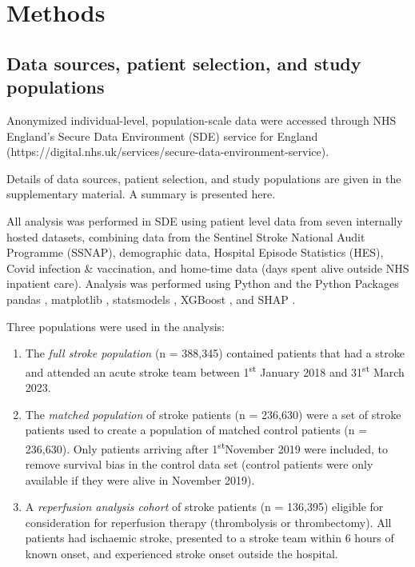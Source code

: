 \section{Methods}

\subsection{Data sources, patient selection, and study populations}


Anonymized individual-level, population-scale data were accessed through NHS England’s Secure Data Environment (SDE)  service for England (https://digital.nhs.uk/services/secure-data-environment-service).

Details of data sources, patient selection, and study populations are given in the supplementary material. A summary is presented here.

All analysis was performed in SDE using patient level data from seven internally hosted datasets, combining  data from the Sentinel Stroke National Audit Programme (SSNAP), demographic data, Hospital Episode Statistics (HES), Covid infection \& vaccination, and home-time data (days spent alive outside NHS inpatient care). Analysis was performed using Python and the Python Packages pandas \cite{mckinney2011pandas}, matplotlib \cite{barrett2005matplotlib}, statsmodels \cite{seabold2010statsmodels}, XGBoost \cite{XGBoost2026Python}, and SHAP \cite{shap_documentation}.

Three populations were used in the analysis:

\begin{enumerate}
    
    \item The \emph{full stroke population} (n = 388,345) contained patients that had a stroke and attended an acute stroke team between 1\textsuperscript{st} January 2018 and 31\textsuperscript{st} March 2023.
    
    \item The \emph{matched population} of stroke patients (n = 236,630) were a set of stroke patients used to create a population of matched control patients (n = 236,630). Only patients arriving after 1\textsuperscript{st}November 2019 were included, to remove survival bias in the control data set (control patients were only available if they were alive in November 2019).

    \item A \emph{reperfusion analysis cohort} of stroke patients (n = 136,395) eligible for consideration for reperfusion therapy (thrombolysis or thrombectomy). All patients had ischaemic stroke, presented to a stroke team within 6 hours of known onset, and experienced stroke onset outside the hospital.
    
\end{enumerate}

